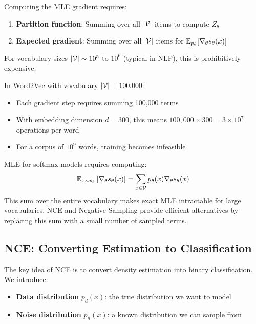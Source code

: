 \begin{notechapter}
\begin{proposition}
Computing the MLE gradient requires:
\begin{enumerate}[label=(\roman*)]
    \item \textbf{Partition function}: Summing over all $|\mathcal{V}|$ items to compute $Z_\theta$
    \item \textbf{Expected gradient}: Summing over all $|\mathcal{V}|$ items for $\mathbb{E}_{p_\theta}[\nabla_\theta s_\theta(x)]$
\end{enumerate}
For vocabulary sizes $|\mathcal{V}| \sim 10^5$ to $10^6$ (typical in NLP), this is prohibitively expensive.
\end{proposition}

\begin{example}
In Word2Vec with vocabulary $|\mathcal{V}| = 100{,}000$:
\begin{itemize}
    \item Each gradient step requires summing 100,000 terms
    \item With embedding dimension $d = 300$, this means $100{,}000 \times 300 = 3 \times 10^7$ operations per word
    \item For a corpus of $10^9$ words, training becomes infeasible
\end{itemize}
\end{example}

\begin{keyresult}
MLE for softmax models requires computing:
\begin{equation}
\mathbb{E}_{x \sim p_\theta}\left[\nabla_\theta s_\theta(x)\right] = \sum_{x \in \mathcal{V}} p_\theta(x) \nabla_\theta s_\theta(x)
\end{equation}
This sum over the entire vocabulary makes exact MLE intractable for large vocabularies. NCE and Negative Sampling provide efficient alternatives by replacing this sum with a small number of sampled terms.
\end{keyresult}

\subsection{NCE: Converting Estimation to Classification}

The key idea of NCE is to convert density estimation into binary classification. We introduce:
\begin{itemize}
    \item \textbf{Data distribution} $p_d(x)$: the true distribution we want to model
    \item \textbf{Noise distribution} $p_n(x)$: a known distribution we can sample from
\end{itemize}


\end{notechapter}
